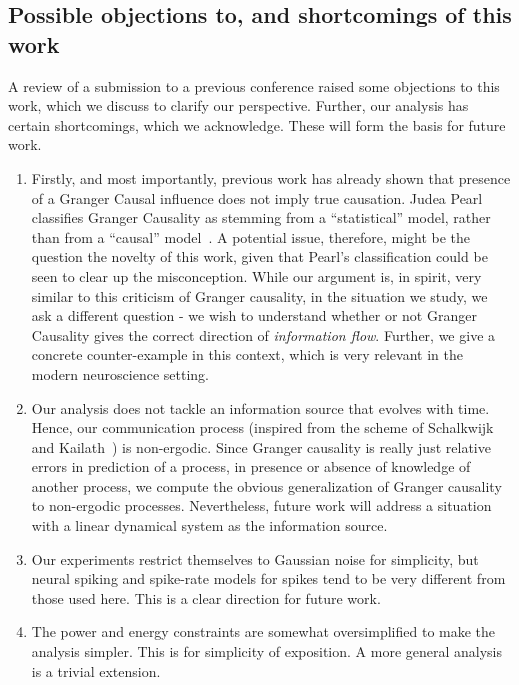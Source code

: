 \documentclass[letterpaper, 10pt, conference]{ieeeconf}
\begin{document}

\subsection{Possible objections to, and shortcomings of this work}
\label{sec:objections-and-shortcomings}

A review of a submission to a previous conference raised some objections to this work, which we discuss to clarify our perspective. Further, our analysis has certain shortcomings, which we acknowledge. These will form the basis for future work.

\begin{enumerate}
	\item Firstly, and most importantly, previous work has already shown that presence of a Granger Causal influence does not imply true causation. Judea Pearl classifies Granger Causality as stemming from a ``statistical'' model, rather than from a ``causal'' model~\cite{pearl2009causality-gc-stat}. A potential issue, therefore, might be the question the novelty of this work, given that Pearl's classification could be seen to clear up the misconception. While our argument is, in spirit, very similar to this criticism of Granger causality, in the situation we study, we ask a different question - we wish to understand whether or not Granger Causality gives the correct direction of \emph{information flow}. Further, we give a concrete counter-example in this context, which is very relevant in the modern neuroscience setting.
	\item Our analysis does not tackle an information source that evolves with time. Hence, our communication process (inspired from the scheme of Schalkwijk and Kailath~\cite{S&K}) is non-ergodic. Since Granger causality is really just relative errors in prediction of a process, in presence or absence of knowledge of another process, we compute the obvious generalization of Granger causality to non-ergodic processes. Nevertheless, future work will address a situation with a linear dynamical system as the information source.
	\item Our experiments restrict themselves to Gaussian noise for simplicity, but neural spiking and spike-rate models for spikes tend to be very different from those used here. This is a clear direction for future work.
	\item The power and energy constraints are somewhat oversimplified to make the analysis simpler. This is for simplicity of exposition. A more general analysis is a trivial extension.

\end{enumerate}
\end{document}
